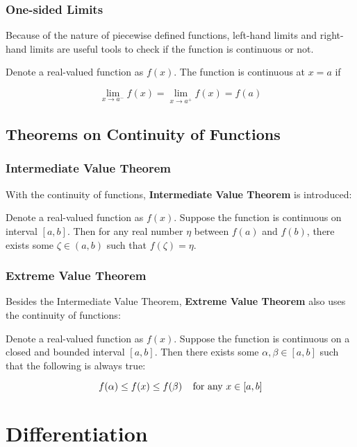 \documentclass[a4paper,12pt]{article}
\begin{document}
\subsubsection{One-sided Limits}
Because of the nature of piecewise defined functions, left-hand limits and right-hand limits are useful tools to check if the function is continuous or not.\n

\begin{thm}
  Denote a real-valued function as $f(x)$. The function is continuous at $x=a$ if

  $$\lim_{x\to a^{-}}f(x)=\lim_{x\to a^{+}}f(x)=f(a)$$
\end{thm}

\subsection{Theorems on Continuity of Functions}
\subsubsection{Intermediate Value Theorem}
With the continuity of functions, \textbf{Intermediate Value Theorem} is introduced:\n

\begin{thm}
  Denote a real-valued function as $f(x)$. Suppose the function is continuous on interval $[a,b]$. Then for any real number $\eta$ between $f(a)$ and $f(b)$, there exists some $\zeta\in (a,b)$ such that $f(\zeta)=\eta$.
\end{thm}

\subsubsection{Extreme Value Theorem}
Besides the Intermediate Value Theorem, \textbf{Extreme Value Theorem} also uses the continuity of functions:\n

\begin{thm}
  Denote a real-valued function as $f(x)$. Suppose the function is continuous on a closed and bounded interval $[a,b]$. Then there exists some $\alpha,\beta\in[a,b]$ such that the following is always true:

  $$f(\alpha)\leq f(x)\leq f(\beta)\;\;\;\;\text{for any }x\in[a,b]$$
\end{thm}

\pagebreak

\section{Differentiation}
\end{document}
